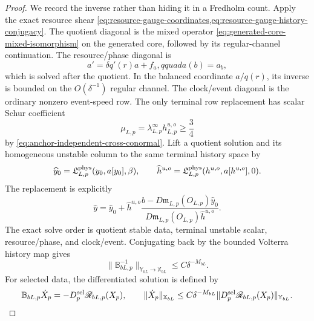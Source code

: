 \begin{proof}
We record the inverse rather than hiding it in a Fredholm count.  Apply the
exact resource shear
\cref{eq:resource-gauge-coordinates,eq:resource-gauge-history-conjugacy}.
The quotient diagonal is the mixed operator
\cref{eq:generated-core-mixed-isomorphism} on the generated core, followed
by its regular-channel continuation.  The resource/phase diagonal is
\begin{equation}
 a'=\delta q'(r)a+f_a,qquad a(b)=a_b,              \label{eq:anchor-b-resource-diagonal}
\end{equation}
which is solved after the quotient.  In the balanced coordinate
\(a/q(r)\), its inverse is bounded on the \(O(\delta^{-1})\) regular
channel.  The clock/event diagonal is the ordinary nonzero event-speed
row.  The only terminal row replacement has scalar Schur coefficient
\begin{equation}
 \mu_{L,p}=\lambda_{L,p}^{\infty}h_{L,p}^{u,o}\ge\frac34          \label{eq:anchor-b-terminal-Schur}
\end{equation}
by \cref{eq:anchor-independent-cross-conormal}.  Lift a quotient solution
and its homogeneous unstable column to the same terminal history space by
\[
 \widehat y_0=\mathfrak L^{\rm phys}_{L,p}(y_0,a[y_0],\beta),
 \qquad
 \widehat h^{u,o}
 =\mathfrak L^{\rm phys}_{L,p}(h^{u,o},a[h^{u,o}],0).
\]
The replacement is explicitly
\begin{equation}
 \widehat y=\widehat y_0+\widehat h^{u,o}
   \frac{b-D\mathfrak m_{L,p}(O_{L,p})\widehat y_0}
        {D\mathfrak m_{L,p}(O_{L,p})\widehat h^{u,o}}.          \label{eq:anchor-b-terminal-row-replacement}
\end{equation}
The exact solve order is quotient stable data, terminal unstable scalar,
resource/phase, and clock/event.  Conjugating back by the bounded Volterra
history map gives
\begin{equation}
 \|\mathbb B_{bL,p}^{-1}\|_{\mathbb Y_{bL}\to\mathbb X_{bL}}
 \le C\delta^{-M_{bL}}.                            \label{eq:anchor-b-full-linear-inverse}
\end{equation}
For selected data, the differentiated solution is defined by
\begin{equation}
 \mathbb B_{bL,p}\dot X_p
 =-D_p^{\rm sel}\mathscr R_{bL,p}(X_p),
 \qquad
 \|\dot X_p\|_{\mathbb X_{bL}}
 \le C\delta^{-M_{bL}}
       \|D_p^{\rm sel}\mathscr R_{bL,p}(X_p)\|_{\mathbb Y_{bL}}.
                                                               \label{eq:anchor-b-selected-solution-equation}
\end{equation}


\end{proof}
